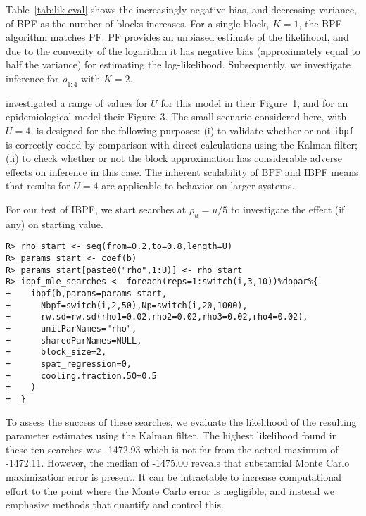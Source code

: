 \documentclass[12pt]{article}\usepackage[]{graphicx}\usepackage[]{xcolor}
\makeatletter
\newenvironment{kframe}{%
 \def\at@end@of@kframe{}%
 \ifinner\ifhmode%
  \def\at@end@of@kframe{\end{minipage}}%
  \begin{minipage}{\columnwidth}%
 \fi\fi%
 \def\FrameCommand##1{\hskip\@totalleftmargin \hskip-\fboxsep
 \colorbox{shadecolor}{##1}\hskip-\fboxsep
     \hskip-\linewidth \hskip-\@totalleftmargin \hskip\columnwidth}%
 \MakeFramed {\advance\hsize-\width
   \@totalleftmargin\z@ \linewidth\hsize
   \@setminipage}}%
 {\par\unskip\endMakeFramed%
 \at@end@of@kframe}
\newenvironment{knitrout}{}{} %
\newcommand\code[1]{\texttt{#1}}
\makeatother
\begin{document}
Table~\ref{tab:lik-eval} shows the increasingly negative bias, and decreasing variance, of BPF as the number of blocks increases.
For a single block, $K=1$, the BPF algorithm matches PF.
PF provides an unbiased estimate of the likelihood, and due to the convexity of the logarithm it has negative bias (approximately equal to half the variance) for estimating the log-likelihood.
Subsequently, we investigate inference for $\rho_{1:4}$ with $K=2$.

\citet{ionides21} investigated a range of values for $U$ for this model in their Figure~1, and for an epidemiological model their Figure~3.
The small scenario considered here, with $U=4$, is designed for the following purposes: (i) to validate whether or not \code{ibpf} is correctly coded by comparison with direct calculations using the Kalman filter; (ii) to check whether or not the block approximation has considerable adverse effects on inference in this case.
The inherent scalability of BPF and IBPF means that results for $U=4$ are applicable to behavior on larger systems.

For our test of IBPF, we start searches at $\rho_u=u/5$ to investigate the effect (if any) on starting value.







\begin{knitrout}
\color{fgcolor}\begin{kframe}
\begin{verbatim}
R> rho_start <- seq(from=0.2,to=0.8,length=U)
R> params_start <- coef(b)
R> params_start[paste0("rho",1:U)] <- rho_start
R> ibpf_mle_searches <- foreach(reps=1:switch(i,3,10))%dopar%{
+    ibpf(b,params=params_start,
+      Nbpf=switch(i,2,50),Np=switch(i,20,1000),
+      rw.sd=rw.sd(rho1=0.02,rho2=0.02,rho3=0.02,rho4=0.02),
+      unitParNames="rho",
+      sharedParNames=NULL,
+      block_size=2,
+      spat_regression=0,
+      cooling.fraction.50=0.5
+    )
+  }
\end{verbatim}
\end{kframe}
\end{knitrout}




To assess the success of these searches, we evaluate the likelihood of the resulting parameter estimates using the Kalman filter.
The highest likelihood found in these ten searches was -1472.93
 which is not far from the actual maximum of -1472.11.
However, the median of -1475.00 reveals that substantial Monte Carlo maximization error is present.
It can be intractable to increase computational effort to the point where the Monte Carlo error is negligible, and instead we emphasize methods that quantify and control this.
\end{document}
